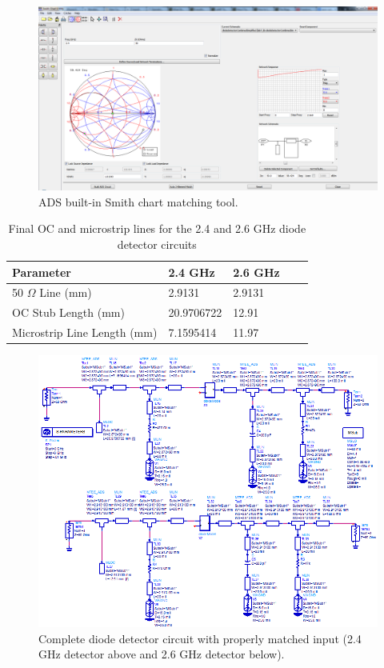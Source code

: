 \documentclass[conference]{IEEEtran}
\begin{document}
\begin{figure}[!htb]
\centering
\includegraphics[scale=0.2]{diode-pics/smithcharttool.png}
\caption{ADS built-in Smith chart matching tool.}
\label{fig:smithchartTool}
\end{figure}

\begin{table}
   \caption{Final OC and microstrip lines for the 2.4 and 2.6 GHz diode detector circuits}
    \begin{tabular}{|l|l|l|l|l}
   \hline
    Parameter                          & 2.4 GHz    & 2.6 GHz  \\ \hline
    50 $\Omega$ Line (mm)       & 2.9131     & 2.9131   \\ \hline
    OC Stub Length (mm)         & 20.9706722 &    12.91 \\ \hline
    Microstrip Line Length (mm) & 7.1595414  & 11.97    \\ \hline
    \end{tabular}
\label{tab:diodetable}
\end{table}

\begin{figure}[!htb]
\centering
\includegraphics[scale=0.4]{diode-pics/diodedetectorsfinalchematic.png}
\caption{Complete diode detector circuit with properly matched input (2.4 GHz detector above and 2.6 GHz detector below).}
\label{fig:FinalDDSchematic}
\end{figure}
\end{document}
